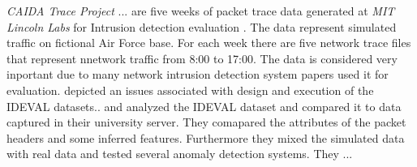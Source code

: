 \emph{CAIDA Trace Project} \cite{caida2011trace}... %
 are five weeks of packet trace data generated at \emph{MIT Lincoln Labs} for
Intrusion detection evaluation \cite{darpa1999ids}.  The data represent simulated traffic on fictional Air Force base.
For each week there are five network trace files that represent nnetwork traffic from 8:00 to 17:00. The data is considered
very inportant due to many network intrusion detection system papers used it for evaluation.
%
 \cite{mchugh2000testing} depicted an issues associated with design and execution of the IDEVAL datasets..
%
 and  \cite{mahoney2003analysis}
analyzed the IDEVAL dataset and compared it to data captured in their university server.
They comapared the attributes of the packet headers and some inferred features. Furthermore they mixed the simulated data with real data
and tested several anomaly detection systems. They ... %
%
